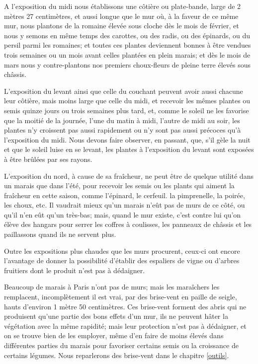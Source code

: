 \documentclass[10pt,a4paper]{book}
\begin{document}
A l'exposition du midi nous établissons une côtière ou plate-bande, large de 2 mètres 27 centimètres, et aussi longue que le mur où, à la faveur de ce même mur, nous plantons de la romaine élevée sous cloche dès le mois de février, et nous y semons en même temps des carottes, ou des radis, ou des épinards, ou du persil parmi les romaines; et toutes ces plantes deviennent bonnes à être vendues trois semaines ou un mois avant celles plantées en plein marais; et dès le mois de mars nous y contre-plantons nos premiers choux-fleurs de pleine terre élevés sous châssis.

L'exposition du levant ainsi que celle du couchant peuvent avoir aussi chacune leur côtière, mais moins large que celle du midi, et recevoir les mêmes plantes ou semis quinze jours ou trois semaines plus tard, et, comme le soleil ne les favorise que la moitié de la journée, l'une du matin à midi, l'autre de midi au soir, les plantes n'y croissent pas aussi rapidement ou n'y sont pas aussi précoces qu'à l'exposition du midi. Nous devons faire observer, en passant, que, s'il gèle la nuit et que le soleil luise en se levant, les plantes à l'exposition du levant sont exposées à être brûlées par ses rayons.

L'exposition du nord, à cause de sa fraîcheur, ne peut être de quelque utilité dans un marais que dans l'été, pour recevoir les semis ou les plants qui aiment la fraîcheur en cette saison, comme l'épinard, le cerfeuil. la pimprenelle, la poirée, les choux, etc. Il vaudrait mieux qu'un marais n'eût pas de murs de ce côté, ou qu'il n'en eût qu'un très-bas; mais, quand le mur existe, c'est contre lui qu'on élève des hangars pour serrer les coffres à coulisses, les panneaux de châssis et les paillassons quand ils ne servent plus.

Outre les expositions plus chaudes que les murs procurent, ceux-ci ont encore l'avantage de donner la possibilité d'établir des espaliers de vigne ou d'arbres fruitiers dont le produit n'est pas à dédaigner.

Beaucoup de marais à Paris n'ont pas de murs; mais les maraîchers les remplacent, incomplètement il est vrai, par des brise-vent en paille de seigle, hauts d'environ 1 mètre 50 centimètres. Ces brise-vent forment des abris qui ne produisent qu'une partie des bons effets d'un mur, ils ne peuvent hâter la végétation avec la même rapidité; mais leur protection n'est pas à dédaigner, et on se trouve bien de les employer, même d'en faire de moins élevés dans différentes parties du marais pour favoriser certains semis ou la croissance de certains légumes. Nous reparlerons des brise-vent dans le chapitre \ref{outils}.
\end{document}
